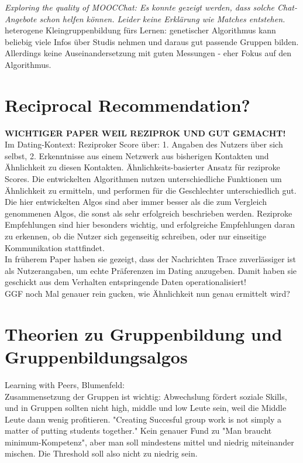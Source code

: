 \documentclass[nochapterpage,bigchapter,linedtoc,longdoc,colorback,accentcolor=tud3b,oneside]{tudreport}
\begin{document}
\textit{Exploring the quality of MOOCChat: Es konnte gezeigt werden, dass solche Chat-Angebote schon helfen können. Leider keine Erklärung wie Matches entstehen. \cite{reidsema2016exploring}}\\

heterogene Kleingruppenbildung fürs Lernen: genetischer Algorithmus kann beliebig viele Infos über Studis nehmen und daraus gut passende Gruppen bilden. Allerdings keine Auseinandersetzung mit guten Messungen - eher Fokus auf den Algorithmus. \cite{moreno2012genetic}\\

\section{Reciprocal Recommendation?}

\textbf{WICHTIGER PAPER WEIL REZIPROK UND GUT GEMACHT!}\\
Im Dating-Kontext: Reziproker Score über: 1. Angaben des Nutzers über sich selbst, 2. Erkenntnisse aus einem Netzwerk aus bisherigen Kontakten und Ähnlichkeit zu diesen Kontakten. Ähnlichkeits-basierter Ansatz für reziproke Scores. Die entwickelten Algorithmen nutzen unterschiedliche Funktionen um Ähnlichkeit zu ermitteln, und performen für die Geschlechter unterschiedlich gut. Die hier entwickelten Algos sind aber immer besser als die zum Vergleich genommenen Algos, die sonst als sehr erfolgreich beschrieben werden. Reziproke Empfehlungen sind hier besonders wichtig, und erfolgreiche Empfehlungen daran zu erkennen, ob die Nutzer sich gegenseitig schreiben, oder nur einseitige Kommunikation stattfindet. \cite{xia2015reciprocal} \\
In früherem Paper haben sie gezeigt, dass der Nachrichten Trace zuverlässiger ist als Nutzerangaben, um echte Präferenzen im Dating anzugeben. Damit haben sie geschickt aus dem Verhalten entspringende Daten operationalisiert! \cite{xia2014characterization}\\
GGF noch Mal genauer rein gucken, wie Ähnlichkeit nun genau ermittelt wird?\\

\section{Theorien zu Gruppenbildung und Gruppenbildungsalgos}
Learning with Peers, Blumenfeld: \cite{blumenfeld1996learning}\\
Zusammensetzung der Gruppen ist wichtig: Abwechslung fördert soziale Skills, und in Gruppen sollten nicht high, middle und low Leute sein, weil die Middle Leute dann wenig profitieren. "Creating Succesful group work is not simply a matter of putting students together." Kein genauer Fund zu "Man braucht minimum-Kompetenz", aber man soll mindestens mittel und niedrig miteinander mischen. Die Threshold soll also nicht zu niedrig sein.\\
\end{document}
